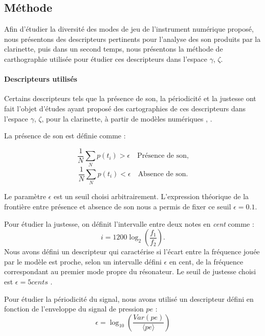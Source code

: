 \documentclass[french, twocolumn]{article}
\begin{document}
\subsection{Méthode}
Afin d'étudier la diversité des modes de jeu de l'instrument numérique proposé, nous présentons des descripteurs pertinents pour l'analyse des son produits par la clarinette, puis dans un second temps, nous présentons la méthode de carthographie utilisée pour étudier ces descripteurs dans l'espace $\gamma$, $\zeta$. 

\paragraph{Descripteurs utilisés}
Certains descripteurs tels que la présence de son, la périodicité et la justesse ont fait l'objet d'études ayant proposé des cartographies de ces descripteurs dans l'espace $\gamma$, $\zeta$, pour la clarinette, à partir de modèles numériques \cite{missoum_explicit_2014}, \cite{doc2014minimal}. 

La présence de son est définie comme \cite{missoum_explicit_2014}: 

\begin{equation*}
    \frac{1}{N}\sum_{N}p(t_i)>\epsilon \quad \text{Présence de son,}  
\end{equation*}
\begin{equation*}
    \frac{1}{N}\sum_{N}p(t_i)<\epsilon  \quad \text{Absence de son.}  
\end{equation*}

Le paramètre $\epsilon$ est un seuil choisi arbitrairement. L'expression théorique de la frontière entre présence et absence de son nous a permis de fixer ce seuil $\epsilon = 0.1$. 

Pour étudier la justesse, on définit l'intervalle entre deux notes en \textit{cent} comme : 
\begin{equation*}
    i = 1200 \log_2 \left( \frac{f_1}{f_2}\right).
\end{equation*}
Nous avons défini un descripteur qui caractérise si l'écart entre la fréquence jouée par le modèle est proche, selon un intervalle défini $\epsilon$ en cent, de la fréquence correspondant au premier mode propre du résonateur. Le seuil de justesse choisi est $\epsilon = 5 cents$ \cite{missoum_explicit_2014}. 

Pour étudier la périodicité du signal, nous avons utilisé un descripteur défini en fonction de l'enveloppe du signal de pression $pe$ \cite{doc2014minimal}: 
\begin{equation*}
    \epsilon = \log_{10}\left(\frac{Var(pe)}{\langle pe \rangle}\right)
\end{equation*}
\end{document}
